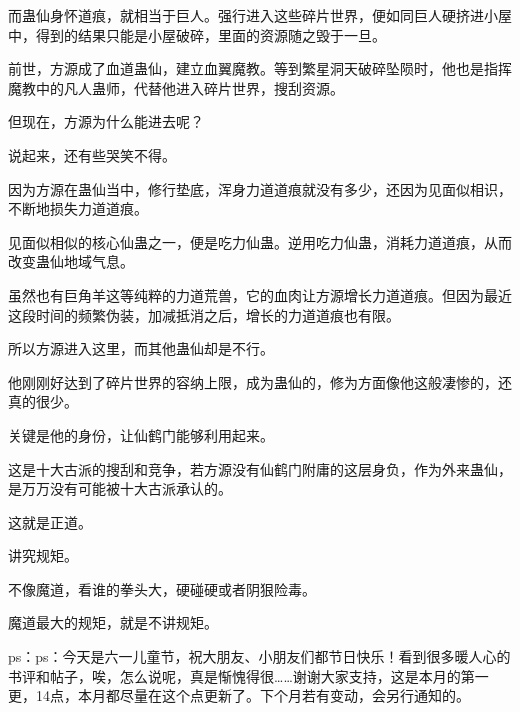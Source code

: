 \begin{this_body}
而蛊仙身怀道痕，就相当于巨人。强行进入这些碎片世界，便如同巨人硬挤进小屋中，得到的结果只能是小屋破碎，里面的资源随之毁于一旦。

前世，方源成了血道蛊仙，建立血翼魔教。等到繁星洞天破碎坠陨时，他也是指挥魔教中的凡人蛊师，代替他进入碎片世界，搜刮资源。

但现在，方源为什么能进去呢？

说起来，还有些哭笑不得。

因为方源在蛊仙当中，修行垫底，浑身力道道痕就没有多少，还因为见面似相识，不断地损失力道道痕。

见面似相似的核心仙蛊之一，便是吃力仙蛊。逆用吃力仙蛊，消耗力道道痕，从而改变蛊仙地域气息。

虽然也有巨角羊这等纯粹的力道荒兽，它的血肉让方源增长力道道痕。但因为最近这段时间的频繁伪装，加减抵消之后，增长的力道道痕也有限。

所以方源进入这里，而其他蛊仙却是不行。

他刚刚好达到了碎片世界的容纳上限，成为蛊仙的，修为方面像他这般凄惨的，还真的很少。

关键是他的身份，让仙鹤门能够利用起来。

这是十大古派的搜刮和竞争，若方源没有仙鹤门附庸的这层身负，作为外来蛊仙，是万万没有可能被十大古派承认的。

这就是正道。

讲究规矩。

不像魔道，看谁的拳头大，硬碰硬或者阴狠险毒。

魔道最大的规矩，就是不讲规矩。

ps：ps：今天是六一儿童节，祝大朋友、小朋友们都节日快乐！看到很多暖人心的书评和帖子，唉，怎么说呢，真是惭愧得很……谢谢大家支持，这是本月的第一更，14点，本月都尽量在这个点更新了。下个月若有变动，会另行通知的。

\end{this_body}

